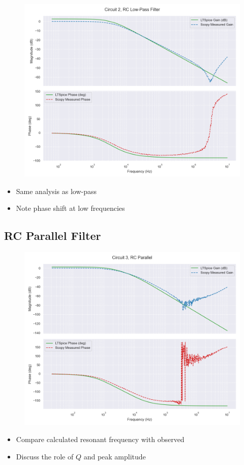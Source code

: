 \documentclass[12pt]{article}
\begin{document}
\begin{figure}[H]
	\includegraphics[width=\textwidth]{e6_bode2}
\end{figure}
\begin{itemize}
	\item Same analysis as low-pass
	\item Note phase shift at low frequencies
\end{itemize}

\subsection{RC Parallel Filter}

\begin{figure}[H]
	\includegraphics[width=\textwidth]{e6_bode3}
\end{figure}
\begin{itemize}
	\item Compare calculated resonant frequency with observed
	\item Discuss the role of $Q$ and peak amplitude
\end{itemize}
\end{document}
